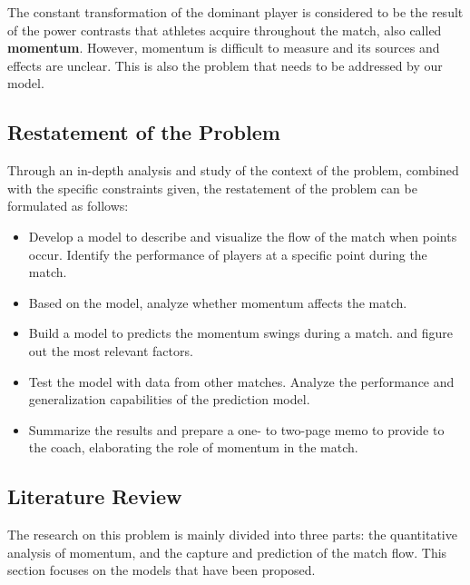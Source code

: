 \documentclass[12pt]{article}  %
\begin{document}
The constant transformation of the dominant player is considered to be the result of the power contrasts that athletes acquire throughout the match, also called \textbf{momentum}. However, momentum is difficult to measure and its sources and effects are unclear. This is also the problem that needs to be addressed by our model.



\subsection{Restatement of the Problem}
Through an in-depth analysis and study of the context of the problem, combined with the specific constraints given, the restatement of the problem can be formulated as follows:

\begin{itemize}
\setlength{\parsep}{0ex} %
\setlength{\topsep}{2ex} %
\setlength{\itemsep}{1ex} %
\item Develop a model to describe and visualize the flow of the match when points occur. Identify the performance of players at a specific point during the match. 

\item Based on the model, analyze whether momentum affects the match. 

\item Build a model to predicts the momentum swings during a match. and figure out the most relevant factors.

\item Test the model with data from other matches. Analyze the performance and generalization capabilities of the prediction model.

\item Summarize the results and prepare a one- to two-page memo to provide to the coach, elaborating the role of momentum in the match.
\end{itemize}

\subsection{Literature Review}

The research on this problem is mainly divided into three parts: the quantitative analysis of momentum, and the capture and prediction of the match flow. This section focuses on the models that have been proposed.
\end{document}
